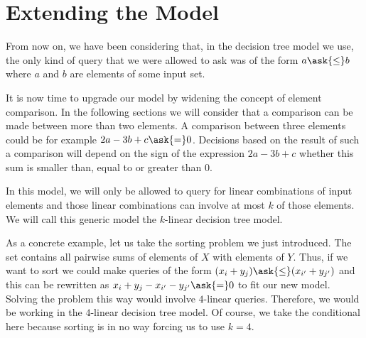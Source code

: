 \section{Extending the Model}

From now on, we have been considering that, in the decision tree
model we use, the only kind of query that we were allowed to ask was of the
form \(a \ask{\le} b \) where \(a\) and \(b\) are elements of some input set.

It is now time to upgrade our model by widening the concept of element
comparison. In the following sections we will consider that a comparison can
be made between more than two elements. A comparison between three
elements could be for example \(2a - 3b + c \ask{=} 0\). Decisions based on the
result of such a comparison will depend on the sign of the expression
\(2a - 3b + c\) \ie whether this sum is smaller than, equal to or greater than
\(0\).

In this model, we will only be allowed to query for linear combinations of
input elements and those linear combinations can involve at most \(k\) of those
elements. We will call this generic model the \(k\)-linear decision tree model.

As a concrete example, let us take the sorting \XY problem we just introduced.
The set \XY contains all pairwise sums of elements of \(X\) with elements of
\(Y\). Thus, if we want to sort \XY we could make queries of the form \((x_i +
y_j) \ask{\le} (x_{i'} + y_{j'})\) and this can be rewritten as \( x_i +
y_j - x_{i'} - y_{j'} \ask{=} 0\) to fit our new model. Solving the problem
this way would involve \(4\)-linear queries. Therefore, we would be working in
the \(4\)-linear decision tree model. Of course, we take the conditional here
because sorting \XY is in no way forcing us to use \(k=4\).
